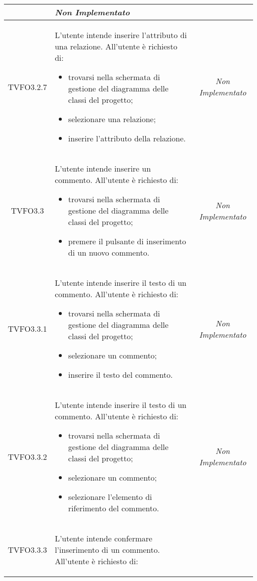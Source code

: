 \begin{longtable}{|c|>{}m{8cm}|c|}
\begin{itemize}
 \end{itemize} & \textit{Non Implementato}\\ \hline
\hypertarget{TVFO3.2.7}{TVFO3.2.7} & L'utente intende inserire l'attributo di una relazione.
All'utente è richiesto di:
\begin{itemize}
	\item trovarsi nella schermata di gestione del diagramma delle classi del progetto;
	\item selezionare una relazione;
	\item inserire l'attributo della relazione.
\end{itemize} & \textit{Non Implementato}\\ \hline
\hypertarget{TVFO3.3}{TVFO3.3} & L'utente intende inserire un commento. 
All'utente è richiesto di: 
\begin{itemize} 
	\item trovarsi nella schermata di gestione del diagramma delle classi del progetto;
	\item premere il pulsante di inserimento di un nuovo commento. 
\end{itemize} & \textit{Non Implementato}\\ \hline
\hypertarget{TVFO3.3.1}{TVFO3.3.1} & L'utente intende inserire il testo di un commento. 
All'utente è richiesto di: 
\begin{itemize} 
	\item trovarsi nella schermata di gestione del diagramma delle classi del progetto;
	\item selezionare un commento;
	\item inserire il testo del commento.
\end{itemize} & \textit{Non Implementato}\\ \hline
\hypertarget{TVFO3.3.2}{TVFO3.3.2} & L'utente intende inserire il testo di un commento. 
All'utente è richiesto di: 
\begin{itemize} 
	\item trovarsi nella schermata di gestione del diagramma delle classi del progetto;
	\item selezionare un commento;
	\item selezionare l'elemento di riferimento del commento. 
\end{itemize} & \textit{Non Implementato}\\ \hline
\hypertarget{TVFO3.3.3}{TVFO3.3.3} & L'utente intende confermare l'inserimento di un commento. 
All'utente è richiesto di: 
\begin{itemize} 

\end{itemize}
\end{longtable}
